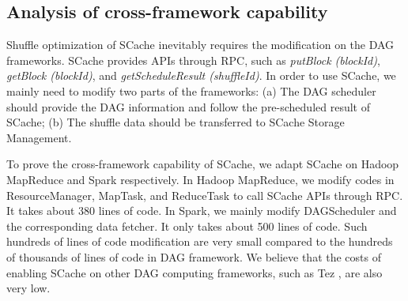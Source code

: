 {\color{blue}
\subsection{Analysis of cross-framework capability}\label{crossframework}
Shuffle optimization of SCache inevitably requires the modification on the DAG frameworks. SCache provides APIs through RPC, such as \textit{putBlock (blockId)}, \textit{getBlock (blockId)}, and \textit{getScheduleResult (shuffleId)}. In order to use SCache, we mainly need to modify two parts of the frameworks: (a) The DAG scheduler should provide the DAG information and follow the pre-scheduled result of SCache; (b) The shuffle data should be transferred to SCache Storage Management.

To prove the cross-framework capability of SCache, we adapt SCache on Hadoop MapReduce and Spark respectively. In Hadoop MapReduce, we modify codes in ResourceManager, MapTask, and ReduceTask to call SCache APIs through RPC. It takes about 380 lines of code. In Spark, we mainly modify DAGScheduler and the corresponding data fetcher. 
It only takes about 500 lines of code. Such hundreds of lines of code modification are very small compared to the hundreds of thousands of lines of code in DAG framework. We believe that the costs of enabling SCache on other DAG computing frameworks, such as Tez \cite{tez}, are also very low.
}

